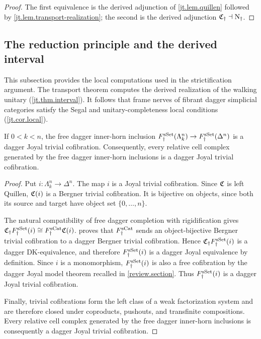 \documentclass[a4paper,dvipdfmx,11pt]{amsart}
\begin{document}
\begin{proof}
  The first equivalence is the derived adjunction of \cref{jt.lem.quillen} followed by \cref{jt.lem.transport-realization};
  the second is the derived adjunction $\mathfrak{C}_{\dag}\dashv \mathrm{N}_{\dag}$.
\end{proof}

\subsection{The reduction principle and the derived interval}

This subsection provides the local computations used in the strictification argument.
The transport theorem computes the derived realization of the walking unitary (\cref{jt.thm.interval}).
It follows that frame nerves of fibrant dagger simplicial categories satisfy the Segal and unitary-completeness local conditions (\cref{jt.cor.local}).

\begin{lemma}\label{jt.lem.free-inner-trivial}
  If $0<k<n$, the free dagger inner-horn inclusion $F_{\dag}^{\mathrm{sSet}}(\Lambda^n_k)\to F_{\dag}^{\mathrm{sSet}}(\Delta^n)$ is a dagger Joyal trivial cofibration.
  Consequently, every relative cell complex generated by the free dagger inner-horn inclusions is a dagger Joyal trivial cofibration.
\end{lemma}

\begin{proof}
  Put $i:\Lambda^n_k\to\Delta^n$.
  The map $i$ is a Joyal trivial cofibration.
  Since $\mathfrak{C}$ is left Quillen, $\mathfrak{C}(i)$ is a Bergner trivial cofibration.
  It is bijective on objects, since both its source and target have object set $\{0,\ldots,n\}$.

  The natural compatibility of free dagger completion with rigidification gives $\mathfrak{C}_{\dag}F_{\dag}^{\mathrm{sSet}}(i) \cong F_{\dag}^{\mathrm{sCat}}\mathfrak{C}(i)$.
  \Cite[Lemma~3.2.7 (2)]{Aka26} proves that $F_{\dag}^{\mathrm{sCat}}$ sends an object-bijective Bergner trivial cofibration to a dagger Bergner trivial cofibration.
  Hence $\mathfrak{C}_{\dag}F_{\dag}^{\mathrm{sSet}}(i)$ is a dagger DK-equivalence, and therefore $F_{\dag}^{\mathrm{sSet}}(i)$ is a dagger Joyal equivalence by definition.
  Since $i$ is a monomorphism, $F_{\dag}^{\mathrm{sSet}}(i)$ is also a free cofibration by the dagger Joyal model theorem recalled in \cref{review.section}.
  Thus $F_{\dag}^{\mathrm{sSet}}(i)$ is a dagger Joyal trivial cofibration.

  Finally, trivial cofibrations form the left class of a weak factorization system and are therefore closed under coproducts, pushouts, and transfinite compositions.
  Every relative cell complex generated by the free dagger inner-horn inclusions is consequently a dagger Joyal trivial cofibration.
\end{proof}
\end{document}
